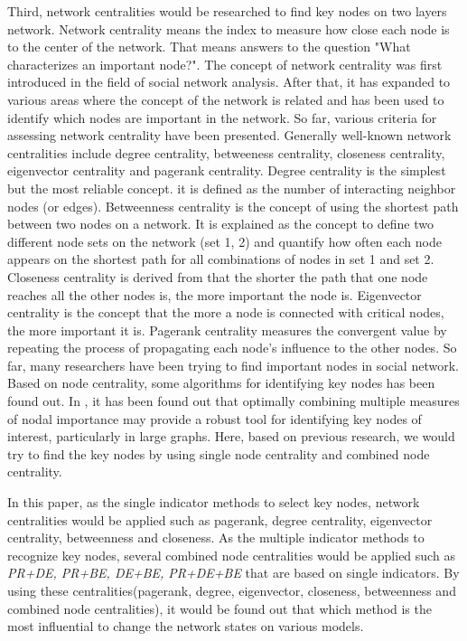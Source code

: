 Third, network centralities would be researched to find key nodes on two layers network. Network centrality means the index to measure how close each node is to the center of the network. That means answers to the question "What characterizes an important node?". The concept of network centrality was first introduced in the field of social network analysis.\parencite{freeman1979} After that, it has expanded to various areas where the concept of the network is related and has been used to identify which nodes are important in the network. So far, various criteria for assessing network centrality have been presented. Generally well-known network centralities include degree centrality, betweeness centrality, closeness centrality, eigenvector centrality and pagerank centrality.\parencite{koschutzki2008, francisco2019, bianconi2018}
Degree centrality is the simplest but the most reliable concept. it is defined as the number of interacting neighbor nodes (or edges). Betweenness centrality is the concept of using the shortest path between two nodes on a network. It is explained as the concept to  define two different node sets on the network (set 1, 2) and quantify how often each node appears on the shortest path for all combinations of nodes in set 1 and set 2. Closeness centrality is derived from that the shorter the path that one node reaches all the other nodes is, the more important the node is. Eigenvector centrality is the concept that the more a node is connected with critical nodes, the more important it is. Pagerank centrality measures the convergent value by repeating the process of propagating each node's influence to the other nodes. 
So far, many researchers have been trying to find important nodes in social network.\parencite{eom2015, white2003, mesgari2015, hwang1981, huang2014} Based on node centrality, some algorithms for identifying key nodes has been found out. In \parencite{mesgari2015, huang2014}, it has been found out that optimally combining multiple measures of nodal importance may provide a robust tool for identifying key nodes of interest, particularly in large graphs. Here, based on previous research, we would try to find the key nodes by using single node centrality and combined node centrality. 

In this paper, as the single indicator methods to select key nodes, network centralities would be applied such as pagerank, degree centrality, eigenvector centrality, betweenness and closeness. As the multiple indicator methods to recognize key nodes, several combined node centralities would be applied such as \textit{PR+DE, PR+BE, DE+BE, PR+DE+BE} that are based on single indicators.  By using these centralities(pagerank, degree, eigenvector, closeness, betweenness and combined node centralities), it would be found out that which method is the most influential to change the network states on various models.  

